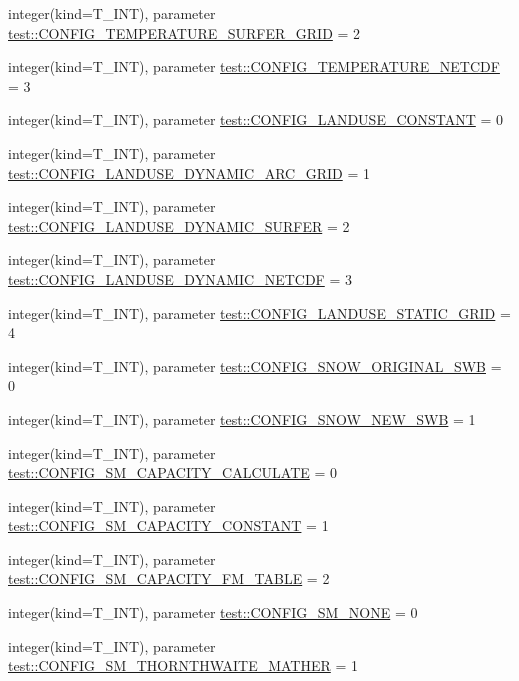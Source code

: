 \begin{DoxyCompactItemize}
integer(kind=T\_\-INT), parameter \hyperlink{namespacetest_a474c230f779edba10f9928cfc29d3a9b}{test::CONFIG\_\-TEMPERATURE\_\-SURFER\_\-GRID} = 2
\item 
integer(kind=T\_\-INT), parameter \hyperlink{namespacetest_afbea0dcb66b0963f92f65620b40b4d85}{test::CONFIG\_\-TEMPERATURE\_\-NETCDF} = 3
\item 
integer(kind=T\_\-INT), parameter \hyperlink{namespacetest_aee066d92ba29f5a5855e38b1ec0bf25b}{test::CONFIG\_\-LANDUSE\_\-CONSTANT} = 0
\item 
integer(kind=T\_\-INT), parameter \hyperlink{namespacetest_ac65abaea28ba58903b2d4f2b096b661c}{test::CONFIG\_\-LANDUSE\_\-DYNAMIC\_\-ARC\_\-GRID} = 1
\item 
integer(kind=T\_\-INT), parameter \hyperlink{namespacetest_ab4d98418b10a5c419d3848523699bd61}{test::CONFIG\_\-LANDUSE\_\-DYNAMIC\_\-SURFER} = 2
\item 
integer(kind=T\_\-INT), parameter \hyperlink{namespacetest_aab4a8dc605bb8e9806d7678f36996890}{test::CONFIG\_\-LANDUSE\_\-DYNAMIC\_\-NETCDF} = 3
\item 
integer(kind=T\_\-INT), parameter \hyperlink{namespacetest_a3fa05e57e81cd6db482ec5db47f0de07}{test::CONFIG\_\-LANDUSE\_\-STATIC\_\-GRID} = 4
\item 
integer(kind=T\_\-INT), parameter \hyperlink{namespacetest_abb5d4895f4dc2885162f36d22c55a9df}{test::CONFIG\_\-SNOW\_\-ORIGINAL\_\-SWB} = 0
\item 
integer(kind=T\_\-INT), parameter \hyperlink{namespacetest_a04623d3a28add7da79b12fd14e1e1d7d}{test::CONFIG\_\-SNOW\_\-NEW\_\-SWB} = 1
\item 
integer(kind=T\_\-INT), parameter \hyperlink{namespacetest_ad70f8862ac83e4d0577411e6342c88ea}{test::CONFIG\_\-SM\_\-CAPACITY\_\-CALCULATE} = 0
\item 
integer(kind=T\_\-INT), parameter \hyperlink{namespacetest_a90bf5bc96833ab6c31224335e8d67784}{test::CONFIG\_\-SM\_\-CAPACITY\_\-CONSTANT} = 1
\item 
integer(kind=T\_\-INT), parameter \hyperlink{namespacetest_a6cb868053790c363d532022df302490f}{test::CONFIG\_\-SM\_\-CAPACITY\_\-FM\_\-TABLE} = 2
\item 
integer(kind=T\_\-INT), parameter \hyperlink{namespacetest_af5783c9f337e9b31e7749b7148302fe7}{test::CONFIG\_\-SM\_\-NONE} = 0
\item 
integer(kind=T\_\-INT), parameter \hyperlink{namespacetest_afe87139521a8c470b4594a41125b1800}{test::CONFIG\_\-SM\_\-THORNTHWAITE\_\-MATHER} = 1
\item 

\end{DoxyCompactItemize}
